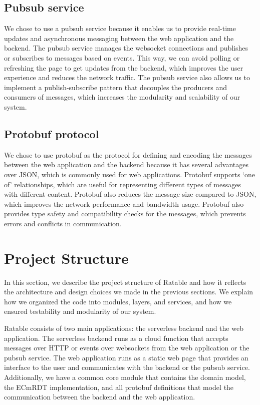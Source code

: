 \documentclass[
	ngerman,
	ruledheaders=section,   %
	class=report,		    %
	thesis={type=bachelor}, %
	accentcolor=9c,			%
	custommargins=true,    %
	marginpar=false,        %
	parskip=half-,          %
	fontsize=11pt,          %
]{tudapub}
\begin{document}
\subsection{Pubsub service}
We chose to use a pubsub service because it enables us to provide real-time updates and asynchronous messaging between the web application and the backend. The pubsub service manages the websocket connections and publishes or subscribes to messages based on events. This way, we can avoid polling or refreshing the page to get updates from the backend, which improves the user experience and reduces the network traffic. The pubsub service also allows us to implement a publish-subscribe pattern that decouples the producers and consumers of messages, which increases the modularity and scalability of our system.

\subsection{Protobuf protocol}
We chose to use protobuf as the protocol for defining and encoding the messages between the web application and the backend because it has several advantages over JSON, which is commonly used for web applications. Protobuf supports ‘one of’ relationships, which are useful for representing different types of messages with different content. Protobuf also reduces the message size compared to JSON, which improves the network performance and bandwidth usage. Protobuf also provides type safety and compatibility checks for the messages, which prevents errors and conflicts in communication.

\section{Project Structure}
In this section, we describe the project structure of Ratable and how it reflects the architecture and design choices we made in the previous sections. We explain how we organized the code into modules, layers, and services, and how we ensured testability and modularity of our system.

Ratable consists of two main applications: the serverless backend and the web application. The serverless backend runs as a cloud function that accepts messages over HTTP or events over websockets from the web application or the pubsub service. The web application runs as a static web page that provides an interface to the user and communicates with the backend or the pubsub service. Additionally, we have a common core module that contains the domain model, the ECmRDT implementation, and all protobuf definitions that model the communication between the backend and the web application.
\end{document}
